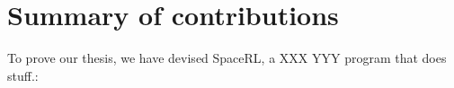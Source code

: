 



\section{Summary of contributions}\label{sec:intro-summary}
To prove our thesis, we have devised SpaceRL, a XXX YYY program that does stuff.:

    

    
